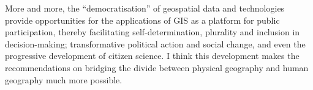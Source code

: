 \documentclass[a4paper, 10.5pt]{article} %
\begin{document}
More and more, the \enquote{democratisation} of geospatial data and technologies provide opportunities for the applications of GIS as a platform for public participation, thereby facilitating self-determination, plurality and inclusion in decision-making; transformative political action and social change, and even the progressive development of citizen science. I think this development makes the recommendations on bridging the divide between physical geography and human geography much more possible.





\end{document}
